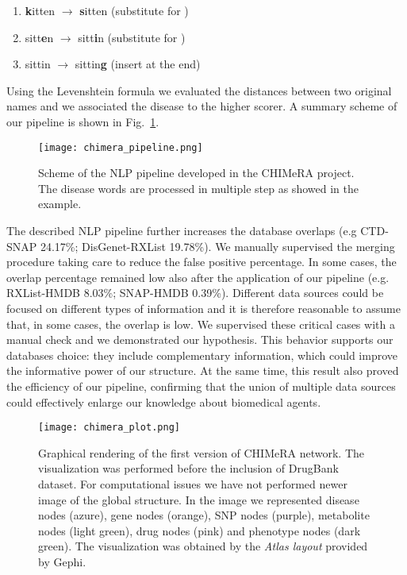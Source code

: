 \documentclass{standalone}
\begin{document}
\begin{enumerate}

  \item \textbf{k}itten $\rightarrow$ \textbf{s}itten (substitute  for )
  \item sitt\textbf{e}n $\rightarrow$ sitt\textbf{i}n (substitute  for )
  \item sittin $\rightarrow$ sittin\textbf{g} (insert  at the end)

\end{enumerate}

Using the Levenshtein formula we evaluated the distances between two original names and we associated the disease to the higher scorer.
A summary scheme of our pipeline is shown in Fig.~\ref{fig:chimera_pipe}.

\begin{figure}[htbp]
\centering
\texttt{[image: chimera\_pipeline.png]}
\caption{Scheme of the NLP pipeline developed in the \textsf{CHIMeRA} project.
The disease words are processed in multiple step as showed in the example.
}
\label{fig:chimera_pipe}
\end{figure}

The described NLP pipeline further increases the database overlaps (e.g CTD-SNAP 24.17\%; DisGenet-RXList 19.78\%).
We manually supervised the merging procedure taking care to reduce the false positive percentage.
In some cases, the overlap percentage remained low also after the application of our pipeline (e.g. RXList-HMDB 8.03\%; SNAP-HMDB 0.39\%).
Different data sources could be focused on different types of information and it is therefore reasonable to assume that, in some cases, the overlap is low.
We supervised these critical cases with a manual check and we demonstrated our hypothesis.
This behavior supports our databases choice: they include complementary information, which could improve the informative power of our structure.
At the same time, this result also proved the efficiency of our pipeline, confirming that the union of multiple data sources could effectively enlarge our knowledge about biomedical agents.

\begin{figure}[htbp]
\centering
\texttt{[image: chimera\_plot.png]}
\caption{Graphical rendering of the first version of \textsf{CHIMeRA} network.
The visualization was performed before the inclusion of DrugBank dataset.
For computational issues we have not performed newer image of the global structure.
In the image we represented disease nodes (azure), gene nodes (orange), SNP nodes (purple), metabolite nodes (light green), drug nodes (pink) and phenotype nodes (dark green).
The visualization was obtained by the \emph{Atlas layout} provided by \textsf{Gephi}.
}
\label{fig:chimera}
\end{figure}
\end{document}

